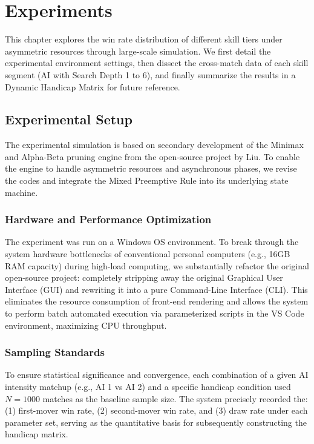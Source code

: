 \chapter{Experiments}
\label{ch:experiment_analysis}

This chapter explores the win rate distribution of different skill tiers under asymmetric resources through large-scale simulation.  We first detail the experimental environment settings, then dissect the cross-match data of each skill segment (AI with Search Depth 1 to 6), and finally summarize the results in a Dynamic Handicap Matrix for future reference.

\section{Experimental Setup}
\label{sec:setting}
The experimental simulation is based on secondary development of the Minimax and Alpha-Beta pruning engine from the open-source project by Liu. To enable the engine to handle asymmetric resources and asynchronous phases, we revise the codes and integrate the Mixed Preemptive Rule into its underlying state machine.

\subsection{Hardware and Performance Optimization}
The experiment was run on a Windows OS environment. To break through the system hardware bottlenecks of conventional personal computers (e.g., 16GB RAM capacity) during high-load computing, we substantially refactor the original open-source project: completely stripping away the original Graphical User Interface (GUI) and rewriting it into a pure Command-Line Interface (CLI). This eliminates the resource consumption of front-end rendering and allows the system to perform batch automated execution via parameterized scripts in the VS Code environment, maximizing CPU throughput.

\subsection{Sampling Standards}
To ensure statistical significance and convergence, each combination of a given AI intensity matchup (e.g., AI 1 vs AI 2) and a specific handicap condition used $N = 1000$ matches as the baseline sample size. The system precisely recorded the: (1) first-mover win rate, (2) second-mover win rate, and (3) draw rate under each parameter set, serving as the quantitative basis for subsequently constructing the handicap matrix.

